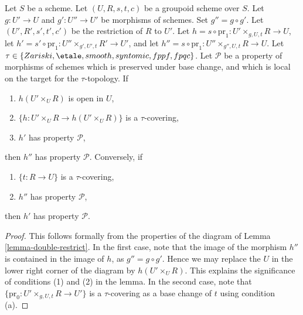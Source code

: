\begin{lemma}
\label{lemma-double-restrict-property}
Let $S$ be a scheme.
Let $(U, R, s, t, c)$ be a groupoid scheme over $S$.
Let $g : U' \to U$ and $g' : U'' \to U'$ be morphisms of schemes.
Set $g'' = g \circ g'$.
Let $(U', R', s', t', c')$ be the restriction of $R$ to $U'$.
Let $h = s \circ \text{pr}_1 : U' \times_{g, U, t} R \to U$,
let $h' = s' \circ \text{pr}_1 : U'' \times_{g', U', t} R' \to U'$, and
let $h'' = s \circ \text{pr}_1 : U'' \times_{g'', U, t} R \to U$.
Let $\tau \in \{Zariski, \linebreak[0] \etale, \linebreak[0]
smooth, \linebreak[0] syntomic, \linebreak[0] fppf, \linebreak[0] fpqc\}$. Let
$\mathcal{P}$ be a property of morphisms of schemes
which is preserved under base change, and which
is local on the target for the $\tau$-topology. If
\begin{enumerate}
\item $h(U' \times_U R)$ is open in $U$,
\item $\{h : U' \times_U R \to h(U' \times_U R)\}$ is a $\tau$-covering,
\item $h'$ has property $\mathcal{P}$,
\end{enumerate}
then $h''$ has property $\mathcal{P}$. Conversely, if
\begin{enumerate}
\item[(a)] $\{t : R \to U\}$ is a $\tau$-covering,
\item[(d)] $h''$ has property $\mathcal{P}$,
\end{enumerate}
then $h'$ has property $\mathcal{P}$.
\end{lemma}

\begin{proof}
This follows formally from the properties of the diagram of
Lemma \ref{lemma-double-restrict}.
In the first case, note that the image of the morphism
$h''$ is contained in the image of $h$, as $g'' = g \circ g'$.
Hence we may replace the $U$ in the lower right corner of the
diagram by $h(U' \times_U R)$. This explains the significance of
conditions (1) and (2) in the lemma. In the second case, note that
$\{\text{pr}_0 : U' \times_{g, U, t} R \to U'\}$ is a $\tau$-covering
as a base change of $t$ using condition (a).
\end{proof}






